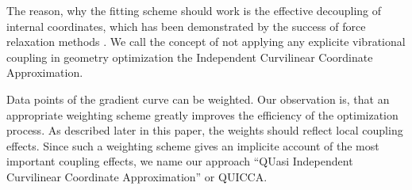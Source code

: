 \documentclass[prl,twocolumn,showpacs,twocolumngrid,superbib]{revtex4}
\begin{document}
The reason, why the fitting scheme should work is the effective
decoupling of internal coordinates, which has been demonstrated
by the success of force relaxation methods \cite{pulay_review,sellers,van_alsenoy_98}. We call the concept of not applying any explicite vibrational 
coupling in geometry optimization
the Independent Curvilinear Coordinate Approximation. 

Data points of the gradient curve can be weighted. Our observation is,
that an appropriate weighting scheme greatly improves the efficiency
of the optimization process. As described later in this paper, 
the weights should reflect local coupling effects. Since such a weighting
scheme gives an implicite account of the most important coupling effects, we
name our approach 
``QUasi Independent Curvilinear Coordinate Approximation'' or QUICCA.


\end{document}
